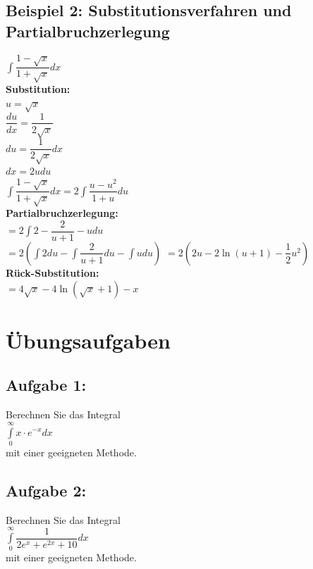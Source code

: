 \documentclass[11pt,final]{scrreprt}
\newcommand{\br} {\medskip\\}
\begin{document}
\subsection*{Beispiel 2: Substitutionsverfahren und Partialbruchzerlegung}
\hspace*{2em}$ \int\dfrac{1-\sqrt{x}}{1+\sqrt{x}} dx$\br
\hspace*{2em}\textbf{Substitution:}\br
\hspace*{4em}$u=\sqrt{x}$\\
\hspace*{4em}$\dfrac{du}{dx} = \dfrac{1}{2\sqrt{x}}$\\
\hspace*{4em}$du = \dfrac{1}{2\sqrt{x}} dx$\\
\hspace*{4em}$dx = 2udu$\br
\hspace*{2em}$\int\dfrac{1-\sqrt{x}}{1+\sqrt{x}} dx = 2\int\dfrac{u-u^2}{1+u} du$\br
\hspace*{2em}\textbf{Partialbruchzerlegung:}\br
\hspace*{4em}$= 2\int2-\dfrac{2}{u+1}-u du $\\
\hspace*{4em}$= 2(\int 2 du - \int\dfrac{2}{u+1} du - \int u du) $
\hspace*{4em}$= 2(2u - 2\ln(u+1) - \dfrac{1}{2}u^2) $\br
\hspace*{2em}\textbf{Rück-Substitution:}\br
\hspace*{4em}$= 4\sqrt{x} - 4\ln(\sqrt{x}+1) - x $

\newpage
\section{Übungsaufgaben}

\subsection*{Aufgabe 1:}
Berechnen Sie das Integral\\
\hspace*{2em} $ \int\limits_0^\infty x\cdot e^{-x} dx $\\
mit einer geeigneten Methode.

\subsection*{Aufgabe 2:}
Berechnen Sie das Integral\\
\hspace*{2em} $ \int\limits_0^\infty \dfrac{1}{2e^x+e^{2x}+10} dx $\\
mit einer geeigneten Methode.
\end{document}

